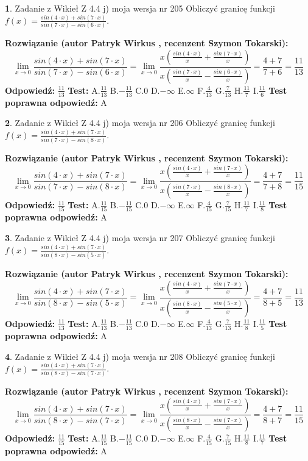 \documentclass[12pt, a4paper]{article}
\theoremstyle{definition} %
\newtheorem{zad}{}
\newcommand{\zadStart}[1]{\begin{zad}#1\newline}
\newcommand{\zadStop}{\end{zad}}
\newcommand{\rozwStart}[2]{\noindent \textbf{Rozwiązanie (autor #1 , recenzent #2): }\newline}
\newcommand{\rozwStop}{\newline}
\newcommand{\odpStart}{\noindent \textbf{Odpowiedź:}\newline}
\newcommand{\odpStop}{\newline}
\newcommand{\testStart}{\noindent \textbf{Test:}\newline}
\newcommand{\testStop}{\newline}
\newcommand{\kluczStart}{\noindent \textbf{Test poprawna odpowiedź:}\newline}
\newcommand{\kluczStop}{\newline}
\begin{document}
\zadStart{Zadanie z Wikieł Z 4.4 j) moja wersja nr 205}
Obliczyć granicę funkcji $f(x)=\frac{sin(4\cdot x) +sin(7\cdot x)}{sin(7\cdot x) -sin(6\cdot x)}$.
\zadStop
\rozwStart{Patryk Wirkus}{Szymon Tokarski}
$$\lim\limits_{x\to 0}\frac{sin(4\cdot x) +sin(7\cdot x)}{sin(7\cdot x) -sin(6\cdot x)}=\lim\limits_{x\to 0}\frac{x(\frac{sin(4\cdot x)}{x}+\frac{sin(7\cdot x)}{x})}{x(\frac{sin(7\cdot x)}{x}-\frac{sin(6\cdot x)}{x})}=\frac{4+7}{7+6} = \frac{11}{13}$$
\rozwStop
\odpStart
$\frac{11}{13}$
\odpStop
\testStart
A.$\frac{11}{13}$
B.$-\frac{11}{13}$
C.$0$
D.$-\infty$
E.$\infty$
F.$\frac{4}{13}$
G.$\frac{7}{13}$
H.$\frac{11}{7}$
I.$\frac{11}{6}$
\testStop
\kluczStart
A
\kluczStop



\zadStart{Zadanie z Wikieł Z 4.4 j) moja wersja nr 206}
Obliczyć granicę funkcji $f(x)=\frac{sin(4\cdot x) +sin(7\cdot x)}{sin(7\cdot x) -sin(8\cdot x)}$.
\zadStop
\rozwStart{Patryk Wirkus}{Szymon Tokarski}
$$\lim\limits_{x\to 0}\frac{sin(4\cdot x) +sin(7\cdot x)}{sin(7\cdot x) -sin(8\cdot x)}=\lim\limits_{x\to 0}\frac{x(\frac{sin(4\cdot x)}{x}+\frac{sin(7\cdot x)}{x})}{x(\frac{sin(7\cdot x)}{x}-\frac{sin(8\cdot x)}{x})}=\frac{4+7}{7+8} = \frac{11}{15}$$
\rozwStop
\odpStart
$\frac{11}{15}$
\odpStop
\testStart
A.$\frac{11}{15}$
B.$-\frac{11}{15}$
C.$0$
D.$-\infty$
E.$\infty$
F.$\frac{4}{15}$
G.$\frac{7}{15}$
H.$\frac{11}{7}$
I.$\frac{11}{8}$
\testStop
\kluczStart
A
\kluczStop



\zadStart{Zadanie z Wikieł Z 4.4 j) moja wersja nr 207}
Obliczyć granicę funkcji $f(x)=\frac{sin(4\cdot x) +sin(7\cdot x)}{sin(8\cdot x) -sin(5\cdot x)}$.
\zadStop
\rozwStart{Patryk Wirkus}{Szymon Tokarski}
$$\lim\limits_{x\to 0}\frac{sin(4\cdot x) +sin(7\cdot x)}{sin(8\cdot x) -sin(5\cdot x)}=\lim\limits_{x\to 0}\frac{x(\frac{sin(4\cdot x)}{x}+\frac{sin(7\cdot x)}{x})}{x(\frac{sin(8\cdot x)}{x}-\frac{sin(5\cdot x)}{x})}=\frac{4+7}{8+5} = \frac{11}{13}$$
\rozwStop
\odpStart
$\frac{11}{13}$
\odpStop
\testStart
A.$\frac{11}{13}$
B.$-\frac{11}{13}$
C.$0$
D.$-\infty$
E.$\infty$
F.$\frac{4}{13}$
G.$\frac{7}{13}$
H.$\frac{11}{8}$
I.$\frac{11}{5}$
\testStop
\kluczStart
A
\kluczStop



\zadStart{Zadanie z Wikieł Z 4.4 j) moja wersja nr 208}
Obliczyć granicę funkcji $f(x)=\frac{sin(4\cdot x) +sin(7\cdot x)}{sin(8\cdot x) -sin(7\cdot x)}$.
\zadStop
\rozwStart{Patryk Wirkus}{Szymon Tokarski}
$$\lim\limits_{x\to 0}\frac{sin(4\cdot x) +sin(7\cdot x)}{sin(8\cdot x) -sin(7\cdot x)}=\lim\limits_{x\to 0}\frac{x(\frac{sin(4\cdot x)}{x}+\frac{sin(7\cdot x)}{x})}{x(\frac{sin(8\cdot x)}{x}-\frac{sin(7\cdot x)}{x})}=\frac{4+7}{8+7} = \frac{11}{15}$$
\rozwStop
\odpStart
$\frac{11}{15}$
\odpStop
\testStart
A.$\frac{11}{15}$
B.$-\frac{11}{15}$
C.$0$
D.$-\infty$
E.$\infty$
F.$\frac{4}{15}$
G.$\frac{7}{15}$
H.$\frac{11}{8}$
I.$\frac{11}{7}$
\testStop
\kluczStart
A
\kluczStop
\end{document}
